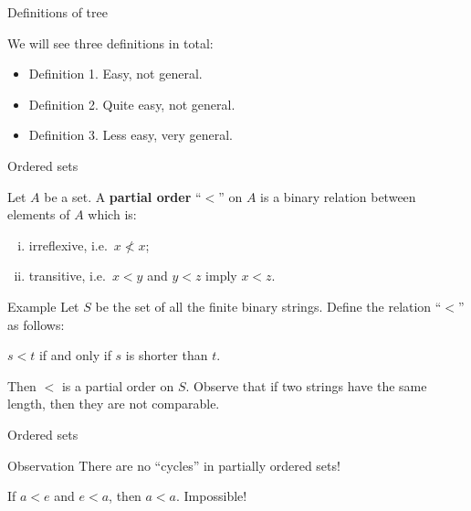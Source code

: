 \documentclass{beamer}
\theoremstyle{num.custom-title}
\theoremstyle{custom-title}
\renewcommand{\emph}[1]{\textbf{#1}}
\begin{document}
\begin{frame}{Definitions of tree}

We will see three definitions in total:

\begin{itemize}
\item Definition 1. Easy, not general.
\item Definition 2. Quite easy, not general.
\item Definition 3. Less easy, very general.
\end{itemize}

\end{frame}


\begin{frame}{Ordered sets}

\begin{definition}
Let $A$ be a set. A \emph{partial order} ``$<$'' on $A$ is a binary relation between elements of $A$ which is:
\begin{enumerate}[(i)]
\item irreflexive, i.e.\ $x \not< x$;
\item transitive, i.e.\ $x < y$ and $y < z$ imply $x < z$.
\end{enumerate}
\end{definition}

\pause

\begin{exampleblock}{Example}
Let $S$ be the set of all the finite binary strings. Define the relation ``$<$'' as follows:
\begin{center}
$s < t$ if and only if $s$ is shorter than $t$.
\end{center}
Then $<$ is a partial order on $S$. Observe that if two strings have the same length, then they are not comparable.
\end{exampleblock}

\end{frame}


\begin{frame}{Ordered sets}

\begin{alertblock}{Observation}
There are no ``cycles'' in partially ordered sets!
\end{alertblock}

\begin{center}
\end{center}

If $a<e$ and $e<a$, then $a<a$. Impossible!

\end{frame}
\end{document}
